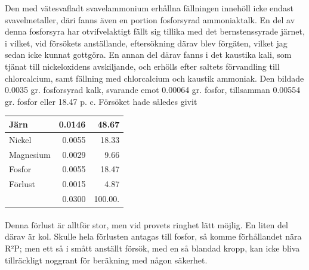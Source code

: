 \documentclass[a4paper, 12pt, oneside, swedish]{article}
\begin{document}
Den med vätesvafladt svavelammonium erhållna fällningen innehöll icke endast svavelmetaller, däri fanns även en portion fosforsyrad ammoniaktalk. En del av denna fosforsyra har otvifvelaktigt fällt sig tillika med det bernstenssyrade järnet, i vilket, vid försökets anställande, eftersökning därav blev förgäten, vilket jag sedan icke kunnat gottgöra. En annan del därav fanns i det kaustika kali, som tjänat till nickeloxidens avskiljande, och erhölls efter saltets förvandling till chlorcalcium, samt fällning med chlorcalcium och kaustik ammoniak. Den bildade 0.0035 gr. fosforsyrad kalk, svarande emot 0.00064 gr. fosfor, tillsamman 0.00554 gr. fosfor eller 18.47 p. c. Försöket hade således givit
\begin{table}[H]
    \centering\small
    \begin{tabular}{|l|r|r|}
    \hline
        Järn & 0.0146 & 48.67 \\ \hline
        Nickel & 0.0055 & 18.33 \\ \hline
        Magnesium & 0.0029 & 9.66 \\ \hline
        Fosfor & 0.0055 & 18.47 \\ \hline
        Förlust & 0.0015 & 4.87 \\ \hline
        ~ & 0.0300 & 100.00. \\ \hline
    \end{tabular}
\end{table}
\paragraph{}
Denna förlust är alltför stor, men vid provets ringhet lätt möjlig. En liten del därav är kol. Skulle hela förlusten antagas till fosfor, så komme förhållandet nära R²P; men ett så i smått anställt försök, med en så blandad kropp, kan icke bliva tillräckligt noggrant för beräkning med någon säkerhet.
\end{document}
